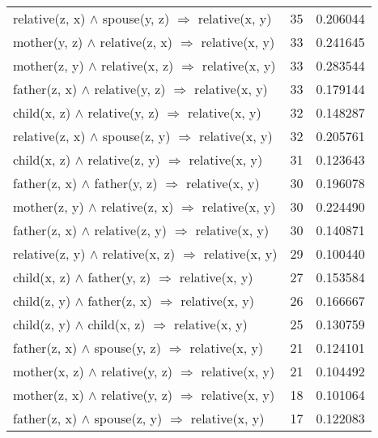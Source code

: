 \begin{longtable}{lrr}
  relative(z, x) $\wedge$ spouse(y, z)   $\Rightarrow$ relative(x, y) &           35 &        0.206044 \\
  mother(y, z) $\wedge$ relative(z, x)   $\Rightarrow$ relative(x, y) &           33 &        0.241645 \\
  mother(z, y) $\wedge$ relative(x, z)   $\Rightarrow$ relative(x, y) &           33 &        0.283544 \\
  father(z, x) $\wedge$ relative(y, z)   $\Rightarrow$ relative(x, y) &           33 &        0.179144 \\
   child(x, z) $\wedge$ relative(y, z)   $\Rightarrow$ relative(x, y) &           32 &        0.148287 \\
  relative(z, x) $\wedge$ spouse(z, y)   $\Rightarrow$ relative(x, y) &           32 &        0.205761 \\
   child(x, z) $\wedge$ relative(z, y)   $\Rightarrow$ relative(x, y) &           31 &        0.123643 \\
    father(z, x) $\wedge$ father(y, z)   $\Rightarrow$ relative(x, y) &           30 &        0.196078 \\
  mother(z, y) $\wedge$ relative(z, x)   $\Rightarrow$ relative(x, y) &           30 &        0.224490 \\
  father(z, x) $\wedge$ relative(z, y)   $\Rightarrow$ relative(x, y) &           30 &        0.140871 \\
relative(z, y) $\wedge$ relative(x, z)   $\Rightarrow$ relative(x, y) &           29 &        0.100440 \\
     child(x, z) $\wedge$ father(y, z)   $\Rightarrow$ relative(x, y) &           27 &        0.153584 \\
     child(z, y) $\wedge$ father(z, x)   $\Rightarrow$ relative(x, y) &           26 &        0.166667 \\
      child(z, y) $\wedge$ child(x, z)   $\Rightarrow$ relative(x, y) &           25 &        0.130759 \\
    father(z, x) $\wedge$ spouse(y, z)   $\Rightarrow$ relative(x, y) &           21 &        0.124101 \\
  mother(x, z) $\wedge$ relative(y, z)   $\Rightarrow$ relative(x, y) &           21 &        0.104492 \\
  mother(z, x) $\wedge$ relative(y, z)   $\Rightarrow$ relative(x, y) &           18 &        0.101064 \\
    father(z, x) $\wedge$ spouse(z, y)   $\Rightarrow$ relative(x, y) &           17 &        0.122083 \\

\end{longtable}
